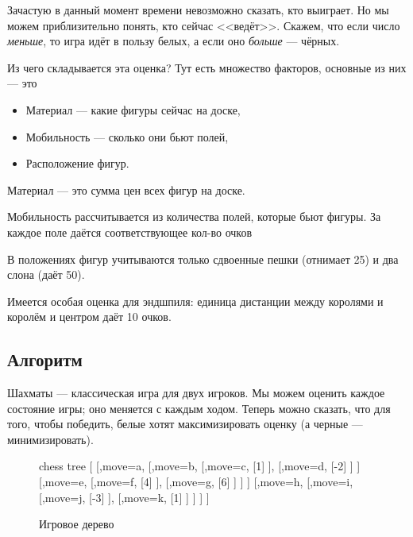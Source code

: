 {	 Зачастую в данный момент времени невозможно сказать, кто выиграет. Но мы можем приблизительно понять, кто сейчас <<ведёт>>. Скажем, что если число \textit{меньше}, то игра идёт в пользу белых, а если оно \textit{больше} --- чёрных. 
	 
	 Из чего складывается эта оценка? Тут есть множество факторов, основные из них --- это
	 
	 \begin{itemize}
	 	\item Материал --- какие фигуры сейчас на доске,
	 	\item Мобильность --- сколько они бьют полей,
	 	\item Расположение фигур.
	 \end{itemize} 
 	
 	Материал --- это сумма цен всех фигур на доске. 
	
	Мобильность рассчитывается из количества полей, которые бьют фигуры. За каждое поле даётся соответствующее кол-во очков 

	В положениях фигур учитываются только сдвоенные пешки (отнимает 25) и два слона (даёт 50). 
	
	Имеется особая оценка для эндшпиля: единица дистанции между королями и королём и центром даёт 10 очков.
	
   	\subsection{Алгоритм}
   	
   	Шахматы --- классическая игра для двух игроков. Мы можем оценить каждое состояние игры; оно меняется с каждым ходом. Теперь можно сказать, что для того, чтобы победить, белые хотят максимизировать оценку (а черные --- минимизировать). 
   	
   	\begin{figure}[h]
   		\centering
   		\caption{Игровое дерево}
   		\label{fig: tree1}
   		
   		\begin{forest}chess tree
   			[
   			[,move=a,
   			[,move=b,
   			[,move=c,
   			[1]
   			],
   			[,move=d,
   			[-2]
   			]
   			]
   			[,move=e,
   			[,move=f,
   			[4]
   			],
   			[,move=g,
   			[6]
   			]
   			]
   			]
   			[,move=h,
   			[,move=i,
   			[,move=j,
   			[-3]
   			],
   			[,move=k,
   			[1]
   			]
   			]	
   			]
   			]
   		\end{forest}
   	\end{figure}
   	
}

